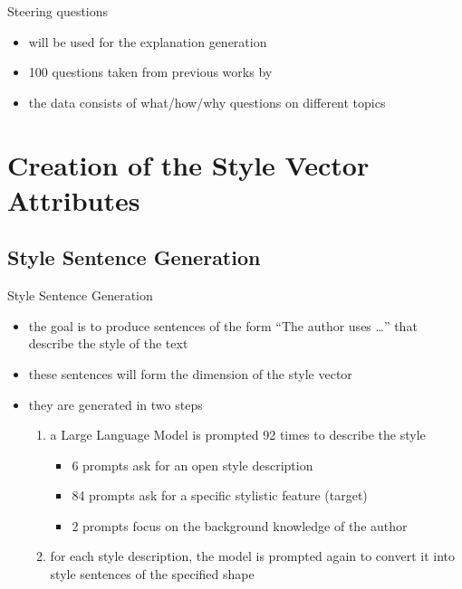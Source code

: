 \documentclass[]{beamer}
\begin{document}
\begin{frame}{Steering questions}
  \begin{itemize}
    \item will be used for the explanation generation
    \item 100 questions taken from previous works by \citet{petroni-etal-2021-kilt,rooeinKnowYourAudience2023}
    \item the data consists of what/how/why questions on different topics
  \end{itemize}
\end{frame}


\section{Creation of the Style Vector Attributes}
\subsection{Style Sentence Generation}
\begin{frame}{Style Sentence Generation}
  \begin{itemize}
    \item the goal is to produce sentences of the form \enquote{The author uses \ldots} that describe the style of the text
    \item these sentences will form the dimension of the style vector
    \item they are generated in two steps
          \pause
          \begin{enumerate}
            \item a Large Language Model is prompted \num{92} times to describe the style
                  \begin{itemize}
                    \item \num{6} prompts ask for an open style description
                    \item \num{84} prompts ask for a specific stylistic feature (target)
                    \item \num{2} prompts focus on the background knowledge of the author
                  \end{itemize}
                  \pause
            \item for each style description, the model is prompted again to convert it into style sentences of the specified shape
          \end{enumerate}
  \end{itemize}
\end{frame}
\end{document}
